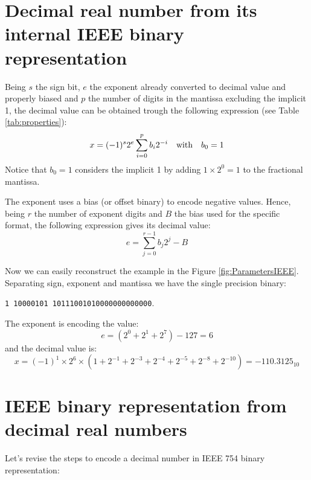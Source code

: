 \section{Decimal real number from its internal IEEE binary representation}

Being $s$ the sign bit, $e$ the exponent already converted to decimal value and properly biased and $p$ the number of digits in the mantissa excluding the implicit 1, the decimal value can be obtained trough the following expression (see Table \ref{tab:properties}): 
$$
   x = (-1)^s  2^e  \sum_{i=0}^{p} b_i 2^{-i} \quad \textnormal{with}\quad b_0 = 1
$$
Notice that $b_0 = 1$ considers the implicit 1 by adding $1\times2^0 = 1$ to the fractional mantissa. %



The exponent uses a bias (or offset binary) to encode negative values. Hence, being $r$ the number of exponent digits and $B$ the bias used for the specific format, the following expression gives its decimal value:
$$
e = \sum_{j=0}^{r-1} b_j 2^j - B 
$$

Now we can easily reconstruct the example in the Figure \ref{fig:ParametersIEEE}. Separating sign, exponent and mantissa we have the single precision binary: 

\texttt{1 10000101 10111001010000000000000}. 

The exponent is encoding the value:
$$
e = ( 2^0 + 2^1 + 2^7 ) - 127 = 6
$$
and the decimal value is:
$$
x = (-1)^1 \times 2^6 \times ( 1 + 2^{-1} + 2^{-3} + 2^{-4} + 2^{-5} + 2^{-8} + 2^{-10} ) = -110.3125_{10}
$$






\section{IEEE binary representation from decimal real numbers}

Let's revise the steps to encode a decimal number in IEEE 754 binary representation:

